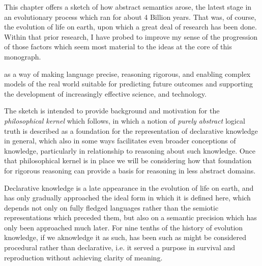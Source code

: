 This chapter offers a sketch of how abstract semantics arose, the latest stage in an evolutionary process which ran for about 4 Billion years.
That was, of course, the evolution of life on earth, upon which a great deal of research has been done.
Within that prior research, I have probed to improve my sense of the progression of those factors which seem most material to the ideas at the core of this monograph.



as a way of making language precise, reasoning rigorous, and enabling complex models of the real world suitable for predicting future outcomes and supporting the development of increasingly effective science, and technology.

The sketch is intended to provide background and motivation for the \emph{philosophical kernel} which follows, in which a notion of \emph{purely abstract} logical truth is described as a foundation for the representation of declarative knowledge in general, which also in some ways facilitates even broader conceptions of knowledge, particularly in relationship to reasoning about such knowledge.
Once that philosophical kernel is in place we will be considering how that foundation for rigorous reasoning can provide a basis for reasoning in less abstract domains.

Declarative knowledge is a late appearance in the evolution of life on earth, and has only gradually approached the ideal form in which it is defined here, which depends not only on fully fledged languages rather than the semiotic representations which preceded them, but also on a semantic precision which has only been approached much later.
For nine tenths of the history of evolution knowledge, if we aknowledge it as such, has been such as might be considered procedural rather than declarative, i.e. it served a purpose in survival and reproduction without achieving clarity of meaning.
